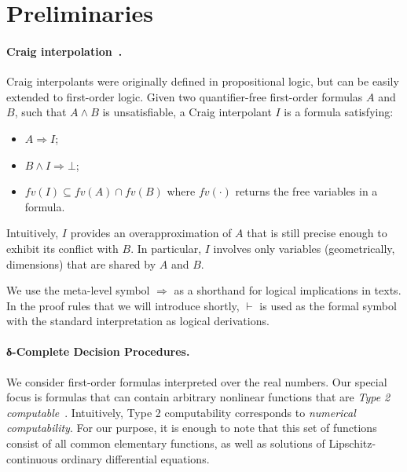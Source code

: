 \section{Preliminaries}
\label{sec:prelim}

\paragraph{Craig interpolation~\cite{MR0104564}.}
Craig interpolants were originally defined in propositional logic, but can be easily extended to first-order logic. Given two quantifier-free first-order formulas $A$ and $B$, such that $A ∧ B$ is unsatisfiable, a Craig interpolant $I$ is a formula satisfying:
\begin{itemize}
\item $A ⇒ I$;
\item $B ∧ I ⇒ ⊥$;
\item $fv(I) ⊆ fv(A) ∩ fv(B)$ where $fv(\cdot)$ returns the free variables in a formula.
\end{itemize}
Intuitively, $I$ provides an overapproximation of $A$ that is still precise enough to exhibit its conflict with $B$. In particular, $I$ involves only variables (geometrically, dimensions) that are shared by $A$ and $B$.  
\begin{notation}
We use the meta-level symbol $\Rightarrow$ as a shorthand for logical implications in texts. In the proof rules that we will introduce shortly, $\vdash$ is used as the formal symbol with the standard interpretation as logical derivations. 
\end{notation}

\paragraph{δ-Complete Decision Procedures.}

We consider first-order formulas interpreted over the real numbers. Our special focus is formulas that can contain arbitrary nonlinear functions that are {\em Type 2 computable}~\cite{CAbook,vasco}. Intuitively, Type 2 computability corresponds to {\em numerical computability}. For our purpose, it is enough to note that this set of functions consist of all common elementary functions, as well as solutions of Lipschitz-continuous ordinary differential equations. 

